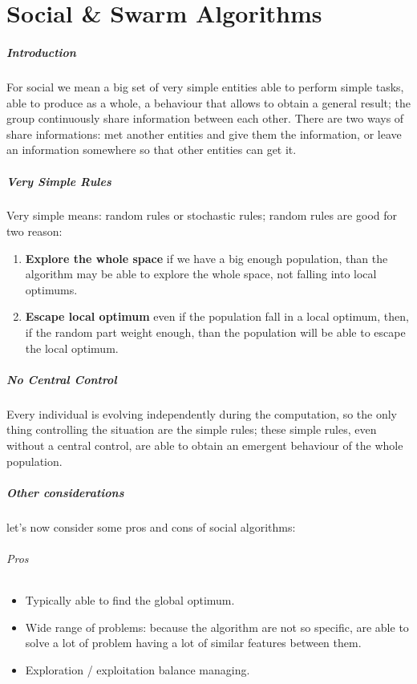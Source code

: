 \documentclass[12pt,a4paper]{report}
\begin{document}
\chapter{Social \& Swarm Algorithms}
\paragraph{Introduction} For social we mean a big set of very simple entities able to perform simple tasks, able to produce as a whole, a behaviour that allows to obtain  a general result; the group continuously share information between each other. There are two ways of share informations: met another entities and give them the information, or leave an information somewhere so that other entities can get it.

\paragraph{Very Simple Rules}
Very simple means: random rules or stochastic rules; random rules are good for two reason:
\begin{enumerate}
\item \textbf{Explore the whole space} if we have a big enough population, than the algorithm may be able to explore the whole space, not falling into local optimums.
\item \textbf{Escape local optimum} even if the population fall in a local optimum, then, if the random part weight enough, than the population will be able to escape the local optimum.
\end{enumerate}

\paragraph{No Central Control}
Every individual is evolving independently during the computation, so the only thing controlling the situation are the simple rules; these simple rules, even without a central control, are able to obtain an emergent behaviour of the whole population.

\paragraph{Other considerations}
let's now consider some pros and cons of social algorithms:
\subparagraph{Pros}
\begin{itemize}
\item Typically able to find the global optimum.
\item Wide range of problems: because the algorithm are not so specific, are able to solve a lot of problem having a lot of similar features between them.
\item Exploration / exploitation balance managing.
\end{itemize}
\end{document}
